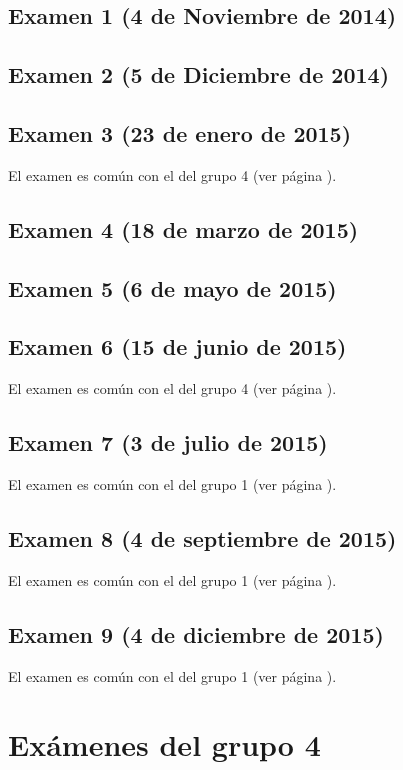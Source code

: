 \documentclass[a4paper,12pt,twoside]{book}
\begin{document}
\section{Examen 1 (4 de Noviembre de 2014)}
\section{Examen 2 (5 de Diciembre de 2014)}
\section{Examen 3 (23 de enero de 2015)}
El examen es común con el del grupo 4 (ver página \pageref{examen_14_15_4_3}).
\section{Examen 4 (18 de marzo de 2015)}
\section{Examen 5 (6 de mayo de 2015)}
\section{Examen 6 (15 de junio de 2015)}
El examen es común con el del grupo 4 (ver página \pageref{examen_14_15_4_6}).
\section{Examen 7 (3 de julio de 2015)}
El examen es común con el del grupo 1 (ver página \pageref{examen_14_15_1_7}).
\section{Examen 8 (4 de septiembre de 2015)}
El examen es común con el del grupo 1 (ver página \pageref{examen_14_15_1_8}).
\section{Examen 9 (4 de diciembre de 2015)}
El examen es común con el del grupo 1 (ver página \pageref{examen_14_15_1_9}).

\chapter{Exámenes del grupo 4} 
\end{document}
